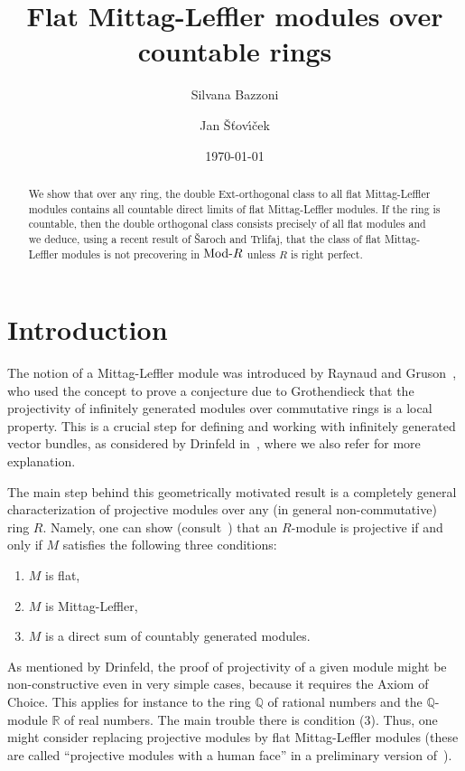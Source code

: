 \documentclass[a4paper,11pt]{amsart}
\title{Flat Mittag-Leffler modules over countable rings}
\author{Silvana Bazzoni}
\author{Jan \v{S}\v{t}ov\'\i\v{c}ek}
\date{\today}
\renewcommand{\iff}{if and only if }
\newcommand{\Mod}[1]{\hbox{\rm Mod-}{#1}}
\theoremstyle{plain}
\theoremstyle{definition}
\theoremstyle{remark}
\begin{document}

\begin{abstract}
We show that over any ring, the double Ext-orthogonal class to all flat Mittag-Leffler modules contains all countable direct limits of flat Mittag-Leffler modules. If the ring is countable, then the double orthogonal class consists precisely of all flat modules and we deduce, using a recent result of \v{S}aroch and Trlifaj, that the class of flat Mittag-Leffler modules is not precovering in $\Mod{R}$ unless $R$ is right perfect.
\end{abstract}

\maketitle



\section*{Introduction}

The notion of a Mittag-Leffler module was introduced by Raynaud and Gruson~\cite{RG}, who used the concept to prove a conjecture due to Grothendieck that the projectivity of infinitely generated modules over commutative rings is a local property. This is a crucial step for defining and working with infinitely generated vector bundles, as considered by Drinfeld in~\cite{Dr}, where we also refer for more explanation.

The main step behind this geometrically motivated result is a completely general characterization of projective modules over any (in general non-commutative) ring $R$. Namely, one can show (consult~\cite{Dr}) that an $R$-module is projective \iff $M$ satisfies the following three conditions:

\begin{enumerate}
 \item $M$ is flat,
 \item $M$ is Mittag-Leffler,
 \item $M$ is a direct sum of countably generated modules.
\end{enumerate}

As mentioned by Drinfeld, the proof of projectivity of a given module might be non-constructive even in very simple cases, because it requires the Axiom of Choice. This applies for instance to the ring $\mathbb{Q}$ of rational numbers and the $\mathbb{Q}$-module $\mathbb{R}$ of real numbers. The main trouble there is condition (3). Thus, one might consider replacing projective modules by flat Mittag-Leffler modules (these are called ``projective modules with a human face'' in a preliminary version of~\cite{Dr}).
\end{document}
